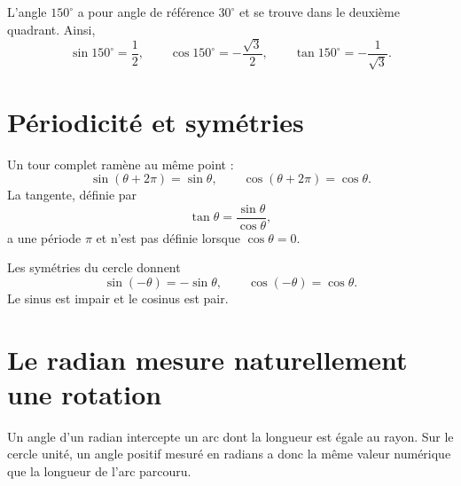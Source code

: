 \begin{examplebox}
L'angle $150^\circ$ a pour angle de référence $30^\circ$ et se trouve dans le deuxième quadrant. Ainsi,
\[
\sin150^\circ=\frac12,
\qquad
\cos150^\circ=-\frac{\sqrt3}{2},
\qquad
\tan150^\circ=-\frac1{\sqrt3}.
\]
\end{examplebox}

\section{Périodicité et symétries}
\label{manual:section:14.04}

Un tour complet ramène au même point :
\[
\sin(\theta+2\pi)=\sin\theta,
\qquad
\cos(\theta+2\pi)=\cos\theta.
\]
La tangente, définie par
\[
\tan\theta=\frac{\sin\theta}{\cos\theta},
\]
a une période $\pi$ et n'est pas définie lorsque $\cos\theta=0$.

Les symétries du cercle donnent
\[
\sin(-\theta)=-\sin\theta,
\qquad
\cos(-\theta)=\cos\theta.
\]
Le sinus est impair et le cosinus est pair.


\section{Le radian mesure naturellement une rotation}
\label{manual:section:14.05}

\begin{visualbox}
Un angle d'un radian intercepte un arc dont la longueur est égale au rayon. Sur le cercle unité, un angle positif mesuré en radians a donc la même valeur numérique que la longueur de l'arc parcouru.
\end{visualbox}

\begin{center}
\qquad
{}
\end{center}

